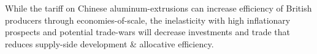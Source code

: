 \documentclass[a4paper,12pt]{article}
\begin{document}

While the tariff on Chinese aluminum-extrusions can increase efficiency of British producers through economies-of-scale, the inelasticity with high inflationary prospects and potential trade-wars will decrease investments and trade that reduces supply-side development \& allocative efficiency.



\newpage
\printbibliography
\end{document}
